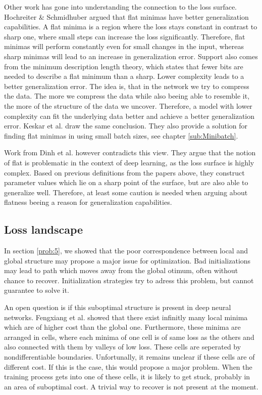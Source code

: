 Other work has gone into understanding the connection to the loss surface.
Hochreiter \& Schmidhuber \cite{hochreiter1997flat} argued that flat minimas
have better generalization capabilities. A flat minima is a region where the
loss stays constant in contrast to sharp one, where small steps can increase
the loss significantly. Therefore, flat minimas will perform constantly even for
small changes in the input, whereas sharp minimas will lead to an increase in
generalization error. Support also comes from the minimum description length
theory, which states that fewer bits are needed to describe a flat minimum than
a sharp. Lower complexity leads to a better generalization error. The idea is,
that in the network we try to compress the data. The more we compress the data
while also beeing able to resemble it, the more of the structure of the data we
uncover. Therefore, a model with lower complexity can fit the underlying data
better and achieve a better generalization error. Keskar et al.
\cite{keskar2016large} draw the same conclusion. They also provide a solution
for finding flat minimas in using small batch sizes, see chapter
\ref{sub:Minibatch}.

Work from Dinh et al. \cite{dinh2017sharp} however contradicts this view. They
argue that the notion of flat is problematic in the context of deep learning, as
the loss surface is highly complex. Based on previous definitions from the
papers above, they construct parameter values which lie on a sharp point of the
surface, but are also able to generalize well. Therefore, at least some caution
is needed when arguing about flatness beeing a reason for generalization
capabilities.

\subsection{Loss landscape}\label{loss_landscape}
In section \ref{prob:5}, we showed that the poor correspondence between local
and global structure may propose a major issue for optimization. Bad
initializations may lead to path which moves away from the global otimum, often
without chance to recover. Initialization strategies try to adress this problem,
but cannot guarantee to solve it.

An open question is if this suboptimal structure is present in deep neural
networks. Fengxiang et al. \cite{he2020piecewise} showed that there exist
infinitly many local minima which are of higher cost than the global one.
Furthermore, these minima are arranged in cells, where each minima of one cell
is of same loss as the others and also connected with them by valleys of low
loss. These cells are seperated by nondifferentiable boundaries. Unfortunally,
it remains unclear if these cells are of different cost. If this is the case,
this would propose a major problem. When the training process gets into one of
these cells, it is likely to get stuck, probably in an area of suboptimal cost.
A trivial way to recover is not present at the moment.

